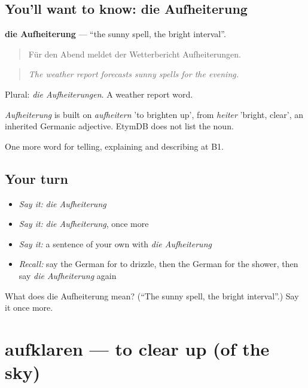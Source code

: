 \subsection*{You'll want to know: die Aufheiterung}
\textbf{die Aufheiterung} — \textquotedblleft{}the sunny spell, the bright interval\textquotedblright{}.

\begin{quote}
Für den Abend meldet der Wetterbericht Aufheiterungen.
\end{quote}

\begin{quote}
\emph{The weather report forecasts sunny spells for the evening.}
\end{quote}

Plural: \emph{die Aufheiterungen}. A weather report word.

\begin{cousinweb}
\emph{Aufheiterung} is built on \emph{aufheitern} 'to brighten up', from \emph{heiter} 'bright, clear', an inherited Germanic adjective. EtymDB does not list the noun.
\end{cousinweb}

\begin{grammarlens}[title={What you've built}]
One more word for telling, explaining and describing at B1.
\end{grammarlens}

\subsection*{Your turn}
\begin{itemize}
\raggedright
  \item \emph{Say it:} \emph{die Aufheiterung}
  \item \emph{Say it:} \emph{die Aufheiterung}, once more
  \item \emph{Say it:} a sentence of your own with \emph{die Aufheiterung}
  \item \emph{Recall:} say the German for to drizzle, then the German for the shower, then say \emph{die Aufheiterung} again
\end{itemize}

\begin{tcolorbox}[breakable,colback=teal!4,colframe=teal!35!black,title={Before you move on}]
What does die Aufheiterung mean? (\textquotedblleft{}The sunny spell, the bright interval\textquotedblright{}.) Say it once more.
\end{tcolorbox}
\section[aufklaren]{aufklaren — to clear up (of the sky)}

